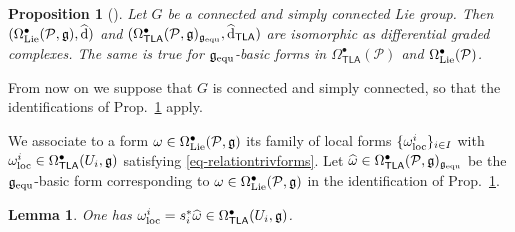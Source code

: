 \documentclass[number]{elsarticle}
\newtheorem{proposition}[theorem]{Proposition}
\newtheorem{lemma}[theorem]{Lemma}
\theoremstyle{definition}
\theoremstyle{remark}
\numberwithin{equation}{section}
\begin{document}
\begin{proposition}[\cite{Mass38}]
\label{prop-identificationdifferentialcalculusAtiyah}
Let $G$ be a connected and simply connected Lie group. Then $(\Omega^{\bullet}_{{\text{\textup{Lie}}}}({{{{\mathcal{{P}}}}}}, {{\mathfrak g}}), {\widehat{\text{\textup{d}}}})$ and $(\Omega^{\bullet}_{{{{\mathbf{\mathsf{{TLA}}}}}}}({{{{\mathcal{{P}}}}}},{{\mathfrak g}})_{{{\mathfrak g}}_{{\text{\textup{equ}}}}}, {\widehat{\text{\textup{d}}}}_{{{{\mathbf{\mathsf{{TLA}}}}}}})$ are isomorphic as differential graded complexes. The same is true for ${{\mathfrak g}}_{{\text{\textup{equ}}}}$-basic forms in $\Omega^{\bullet}_{{{{\mathbf{\mathsf{{TLA}}}}}}}({{{{\mathcal{{P}}}}}})$ and $\Omega^{\bullet}_{{\text{\textup{Lie}}}}({{{{\mathcal{{P}}}}}})$.
\end{proposition}

From now on we suppose that $G$ is connected and simply connected, so that the identifications of Prop.~\ref{prop-identificationdifferentialcalculusAtiyah} apply.

We associate to a form $\omega \in \Omega^{\bullet}_{{\text{\textup{Lie}}}}({{{{\mathcal{{P}}}}}}, {{\mathfrak g}})$ its family of local forms $\{\omega_{{\text{\textup{loc}}}}^i\}_{i \in I}$ with $\omega_{{\text{\textup{loc}}}}^i \in \Omega^{\bullet}_{{{{\mathbf{\mathsf{{TLA}}}}}}}(U_i,{{\mathfrak g}})$ satisfying \eqref{eq-relationtrivforms}. Let ${\widehat{\omega}} \in \Omega^{\bullet}_{{{{\mathbf{\mathsf{{TLA}}}}}}}({{{{\mathcal{{P}}}}}},{{\mathfrak g}})_{{{\mathfrak g}}_{{\text{\textup{equ}}}}}$ be the ${{\mathfrak g}}_{{\text{\textup{equ}}}}$-basic form corresponding to $\omega \in \Omega^{\bullet}_{{\text{\textup{Lie}}}}({{{{\mathcal{{P}}}}}}, {{\mathfrak g}})$ in the identification of Prop.~\ref{prop-identificationdifferentialcalculusAtiyah}. 

\begin{lemma}
\label{lemma-pullbackbasicforms}
One has $\omega_{{\text{\textup{loc}}}}^i = s_i^\ast {\widehat{\omega}} \in \Omega^{\bullet}_{{{{\mathbf{\mathsf{{TLA}}}}}}}(U_i,{{\mathfrak g}})$.
\end{lemma}
\end{document}
